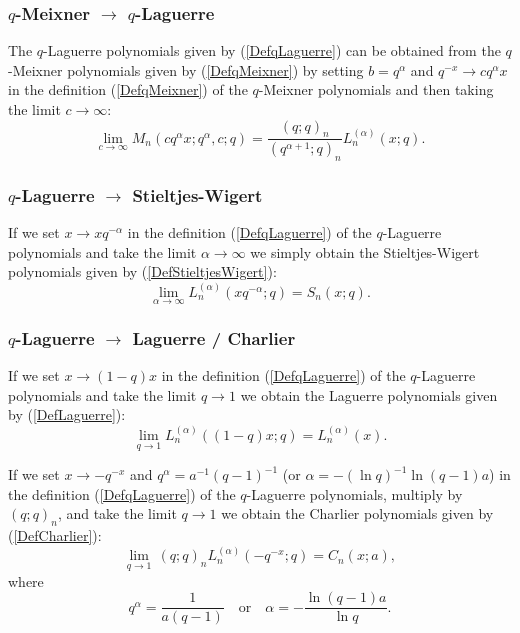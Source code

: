 \documentclass[envcountchap,graybox]{svmono}
\newcounter{rom}
\begin{document}
{{\subsubsection*{$q$-Meixner $\rightarrow$ $q$-Laguerre}
The $q$-Laguerre polynomials given by (\ref{DefqLaguerre}) can be obtained
from the $q$-Meixner polynomials given by (\ref{DefqMeixner}) by setting
$b=q^{\alpha}$ and $q^{-x}\rightarrow cq^{\alpha}x$ in the definition
(\ref{DefqMeixner}) of the $q$-Meixner polynomials and then taking the limit
$c\rightarrow\infty$:
$$\lim_{c\rightarrow\infty}M_n(cq^{\alpha}x;q^{\alpha},c;q)=
\frac{(q;q)_n}{(q^{\alpha+1};q)_n}L_n^{(\alpha)}(x;q).$$

\subsubsection*{$q$-Laguerre $\rightarrow$ Stieltjes-Wigert}
If we set $x\rightarrow xq^{-\alpha}$ in the definition
(\ref{DefqLaguerre}) of the $q$-Laguerre polynomials and take the limit
$\alpha\rightarrow\infty$ we simply obtain the Stieltjes-Wigert polynomials given
by (\ref{DefStieltjesWigert}):
\begin{equation}
\lim_{\alpha\rightarrow\infty}L_n^{(\alpha)}\left(xq^{-\alpha};q\right)=S_n(x;q).
\end{equation}

\subsubsection*{$q$-Laguerre $\rightarrow$ Laguerre / Charlier}
If we set $x\rightarrow (1-q)x$ in the definition (\ref{DefqLaguerre})
of the $q$-Laguerre polynomials and take the limit $q\rightarrow 1$ we obtain
the Laguerre polynomials given by (\ref{DefLaguerre}):
\begin{equation}
\lim_{q\rightarrow 1}L_n^{(\alpha)}((1-q)x;q)=L_n^{(\alpha)}(x).
\end{equation}

If we set $x\rightarrow -q^{-x}$ and $q^{\alpha}=a^{-1}(q-1)^{-1}$ (or
$\alpha=-(\ln q)^{-1}\ln (q-1)a$) in the definition (\ref{DefqLaguerre}) of the
$q$-Laguerre polynomials, multiply by $(q;q)_n$, and take the limit
$q\rightarrow 1$ we obtain the Charlier polynomials given by (\ref{DefCharlier}):
\begin{equation}
\lim_{q\rightarrow 1}\,(q;q)_nL_n^{(\alpha)}(-q^{-x};q)=C_n(x;a),
\end{equation}
where
$$q^{\alpha}=\frac{1}{a(q-1)}\quad\textrm{or}\quad\alpha=-\frac{\ln (q-1)a}{\ln q}.$$

}}
\end{document}

